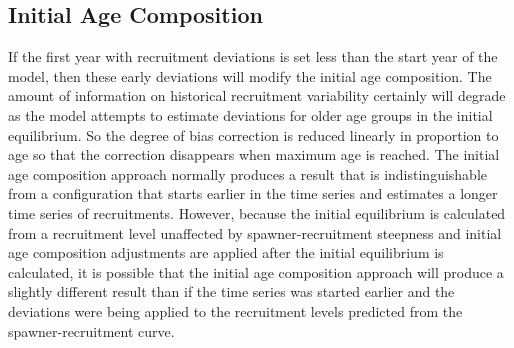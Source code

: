 \subsection{Initial Age Composition}
If the first year with recruitment deviations is set less than the start year of the model, then these early deviations will modify the initial age composition.  The amount of information on historical recruitment variability certainly will degrade as the model attempts to estimate deviations for older age groups in the initial equilibrium.  So the degree of bias correction is reduced linearly in proportion to age so that the correction disappears when maximum age is reached.  The initial age composition approach normally produces a result that is indistinguishable from a configuration that starts earlier in the time series and estimates a longer time series of recruitments.  However, because the initial equilibrium is calculated from a recruitment level unaffected by spawner-recruitment steepness and initial age composition adjustments are applied after the initial equilibrium is calculated, it is possible that the initial age composition approach will produce a slightly different result than if the time series was started earlier and the deviations were being applied to the recruitment levels predicted from the spawner-recruitment curve. 
